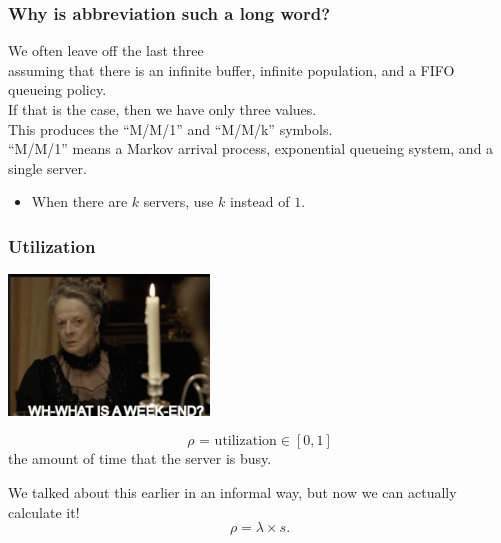 \begin{frame}
\frametitle{Why is abbreviation such a long word?}

\large
\begin{changemargin}{1.5cm}
We often leave off the last three\\
assuming that there is an infinite buffer, infinite population, and a FIFO queueing policy. \\[1em]

If that is the case, then we have only three values. \\[1em]

This produces the ``M/M/1'' and ``M/M/k'' symbols. \\[1em]

``M/M/1'' means a Markov arrival process, exponential queueing system, and a single server. \\

\begin{itemize}
\item When there are $k$ servers, use $k$ instead of $1$.
\end{itemize}
\end{changemargin}

\end{frame}



\begin{frame}
\frametitle{Utilization}

\begin{center}
	\includegraphics[width=0.4\textwidth]{images/weekend.png}
\end{center}

\large
\begin{changemargin}{1.5cm}
\[ \rho \text{ = utilization} \in [0, 1]\]
the amount of time that the server is busy. 

We talked about this earlier in an informal way, but now we can actually calculate it! \\[-1em]

\[ \rho = \lambda \times s.\]
\end{changemargin}

\end{frame}



